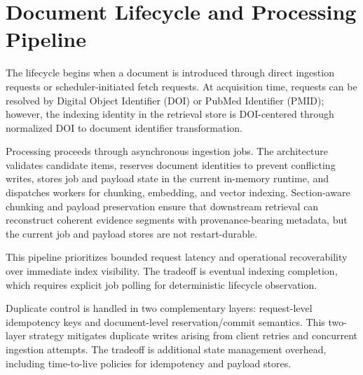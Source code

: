 \section{Document Lifecycle and Processing Pipeline}

The lifecycle begins when a document is introduced through direct ingestion requests or scheduler-initiated fetch requests. At acquisition time, requests can be resolved by Digital Object Identifier (DOI) or PubMed Identifier (PMID); however, the indexing identity in the retrieval store is DOI-centered through normalized DOI to document identifier transformation.

Processing proceeds through asynchronous ingestion jobs. The architecture validates candidate items, reserves document identities to prevent conflicting writes, stores job and payload state in the current in-memory runtime, and dispatches workers for chunking, embedding, and vector indexing. Section-aware chunking and payload preservation ensure that downstream retrieval can reconstruct coherent evidence segments with provenance-bearing metadata, but the current job and payload stores are not restart-durable.

This pipeline prioritizes bounded request latency and operational recoverability over immediate index visibility. The tradeoff is eventual indexing completion, which requires explicit job polling for deterministic lifecycle observation.

Duplicate control is handled in two complementary layers: request-level idempotency keys and document-level reservation/commit semantics. This two-layer strategy mitigates duplicate writes arising from client retries and concurrent ingestion attempts. The tradeoff is additional state management overhead, including time-to-live policies for idempotency and payload stores.

